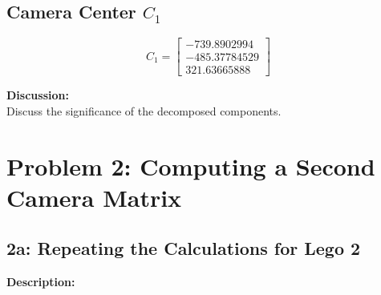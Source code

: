 \documentclass{article}
\begin{document}
\subsection*{Camera Center \( C_1 \)}
\[
C_1 =
\begin{bmatrix}
-739.8902994 \\
-485.37784529 \\
321.63665888
\end{bmatrix}
\]

\textbf{Discussion:} \\
Discuss the significance of the decomposed components.

\newpage
\section{Problem 2: Computing a Second Camera Matrix}

\subsection{2a: Repeating the Calculations for Lego 2}
\textbf{Description:} \\
\end{document}
